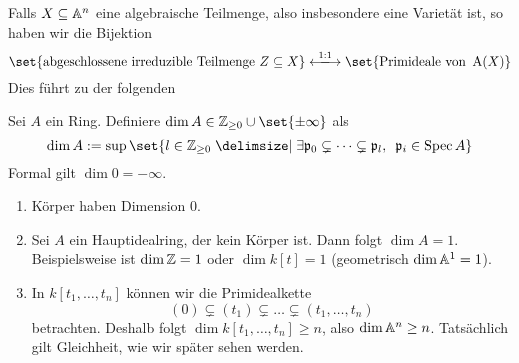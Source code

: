 \documentclass[12pt,a4paper]{scrartcl}
\theoremstyle{cplain}
\theoremstyle{cdef}
\begin{document}
Falls $X \subseteq \mathbb A^n$ eine algebraische Teilmenge, also insbesondere eine Varietät ist, so haben wir die Bijektion
\[\set{\text{abgeschlossene irreduzible Teilmenge }Z\subseteq X}\xlongleftrightarrow{1:1}\set{\text{Primideale von }\A(X)}\]
Dies führt zu der folgenden
\begin{defi}
	Sei $A$ ein Ring. Definiere $\dim A\in \IZ_{\ge 0}\cup\set{\pm\infty}$ als
	\[\dim A := \sup \set{l\in\IZ_{\ge 0}\given \exists \fp_0\subsetneq \dots \subsetneq \fp_l,\enspace \fp_i\in\Spec A}\]
	Formal gilt $\dim 0 = -\infty$.
\end{defi}
\begin{bsp}
	\leavevmode
	\begin{enumerate}
		\item Körper haben Dimension $0$.
		\item Sei $A$ ein Hauptidealring, der kein Körper ist. Dann folgt $\dim A = 1$. Beispielsweise ist $\dim\mathbb Z = 1$ oder $\dim k[t] = 1$ (geometrisch $\dim \mathbb A^1 = 1$).
		\item In $k[t_1,\dots, t_n]$ können wir die Primidealkette
		\[(0)\subsetneq (t_1)\subsetneq \dots \subsetneq (t_1,\dots, t_n)\]
		betrachten. Deshalb folgt $\dim k[t_1,\dots, t_n]\ge n$, also $\dim\mathbb A^n \ge n$. Tatsächlich gilt Gleichheit, wie wir später sehen werden.
	\end{enumerate}
\end{bsp}
\end{document}
